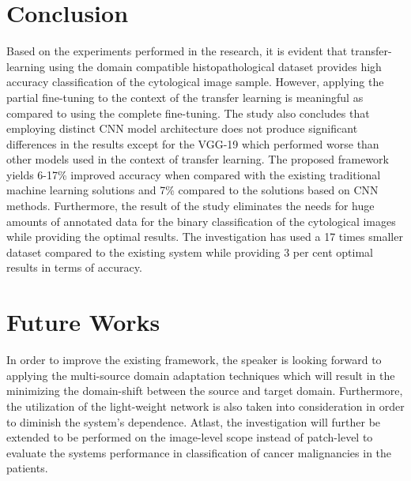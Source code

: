 \section{Conclusion}
Based on the experiments performed in the research, it is evident that transfer-learning using the domain compatible histopathological dataset provides high accuracy classification of the  cytological image sample. However, applying the partial fine-tuning to the context of the transfer learning is meaningful as compared to using the complete fine-tuning. The study also concludes that employing distinct CNN model architecture does not produce significant differences in the results except for the VGG-19 which performed worse than other models used in the context of transfer learning. The proposed framework yields 6-17\% improved accuracy when compared with the existing traditional machine learning solutions and  7\% compared to the solutions based on CNN methods.  Furthermore, the result of the study eliminates the needs for huge amounts of annotated data for the binary classification of the cytological images while providing the optimal results. The investigation has used a 17 times smaller dataset compared to the existing system while providing 3 per cent optimal results in terms of accuracy.

\section{Future Works}
In order to improve the existing framework, the speaker is looking forward to applying the multi-source domain adaptation techniques which will result in the minimizing the domain-shift between the source and target domain. Furthermore, the utilization of the light-weight network is also taken into consideration in order to  diminish the system’s dependence.  Atlast, the investigation will further be extended to be performed on the image-level scope instead of patch-level to evaluate the systems performance in classification of cancer malignancies in the patients. 